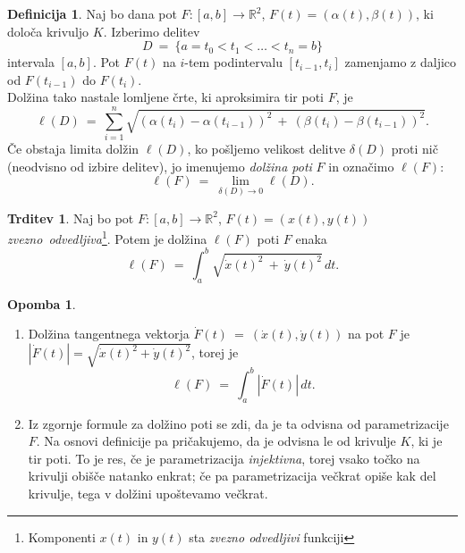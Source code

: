 \documentclass[11pt]{article}
\newcommand{\R}{\mathbb{R}}
\theoremstyle{definition}
\newtheorem{definicija}{Definicija}[section]
\theoremstyle{definition}
\newtheorem{trditev}{Trditev}[section]
\theoremstyle{definition}
\theoremstyle{theorem}
\newtheorem*{opomba}{Opomba}
\begin{document}
\begin{definicija}

Naj bo dana pot $F:[a, b] \rightarrow \mathbb{R}^2$, $F(t) = (\alpha(t), \beta(t))$, ki določa krivuljo $K$. Izberimo delitev
$$D ~=~ \{a = t_0 < t_1 < \ldots < t_n = b\}$$
intervala $[a, b]$. Pot $F(t)$ na $i$-tem podintervalu $[t_{i-1}, t_i]$ zamenjamo z daljico od $F(t_{i-1})$ do $F(t_i)$. \\
Dolžina tako nastale lomljene črte, ki aproksimira tir poti $F$, je 
$$\ell(D) ~=~ \sum_{i = 1}^{n} \sqrt{ (\alpha(t_i) - \alpha(t_{i-1}))^2 ~+~ (\beta(t_i) - \beta(t_{i-1}))^2 }.$$
Če obstaja limita dolžin $\ell(D)$, ko pošljemo velikost delitve $\delta(D)$ proti nič (neodvisno od izbire delitev), jo imenujemo \textit{dolžina poti} $F$ in označimo $\ell(F)$:
$$\ell(F) ~=~ \lim_{\delta(D) \rightarrow 0} \ell(D).$$

\end{definicija}
\vspace{0.5cm}

\begin{trditev}

Naj bo pot $F: [a, b] \rightarrow \R^2$, $F(t) = (x(t), y(t))$ \hbox{\textit{zvezno odvedljiva}}\footnote{Komponenti $x(t)$ in $y(t)$ sta \textit{zvezno odvedljivi} funkciji}. Potem je dolžina $\ell(F)$ poti $F$ enaka
$$\ell(F) ~=~ \int_a^b \sqrt{\dot{x}(t)^2 ~+~ \dot{y}(t)^2}\,dt.$$

\end{trditev}
\vspace{0.5cm}

\begin{opomba}
~
\begin{enumerate}
	\item Dolžina tangentnega vektorja $\dot{F}(t) ~=~ (\dot{x}(t), \dot{y}(t))$ na pot $F$ je \\$|\dot{F}(t)| = \sqrt{\dot{x}(t)^2 + \dot{y}(t)^2}$, torej je
	$$\ell(F) ~=~ \int_a^b |\dot{F}(t)|\,dt.$$
	
	\item Iz zgornje formule za dolžino poti se zdi, da je ta odvisna od parametrizacije $F$. Na osnovi definicije pa pričakujemo, da je odvisna le od krivulje $K$, ki je tir poti. To je res, če je parametrizacija \textit{injektivna}, torej vsako točko na krivulji obišče natanko enkrat; če pa parametrizacija večkrat opiše kak del krivulje, tega v dolžini upoštevamo večkrat.
\end{enumerate}
\end{opomba}
\vspace{0.5cm}
\end{document}
